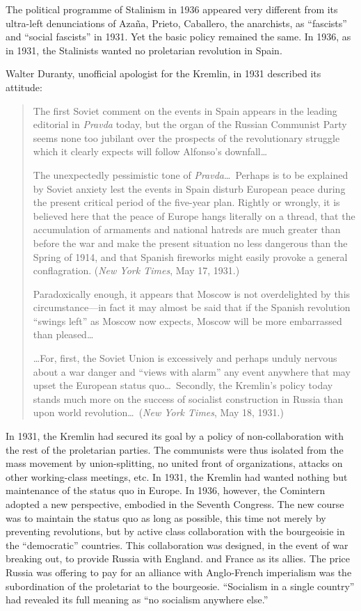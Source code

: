 The political programme of Stalinism in 1936 appeared very different from its ultra-left denunciations of Azaña, Prieto, Caballero, the anarchists, as ``fascists'' and ``social fascists'' in 1931. Yet the basic policy remained the same. In 1936, as in 1931, the Stalinists wanted no proletarian revolution in Spain.

Walter Duranty, unofficial apologist for the Kremlin, in 1931 described its attitude:

\begin{quotation}
  The first Soviet comment on the events in Spain appears in the leading editorial in \emph{Pravda} today, but the organ of the Russian Communist Party seems none too jubilant over the prospects of the revolutionary struggle which it clearly expects will follow Alfonso’s downfall\ldots
  
  The unexpectedly pessimistic tone of \emph{Pravda}\ldots\ Perhaps is to be explained by Soviet anxiety lest the events in Spain disturb European peace during the present critical period of the five-year plan. Rightly or wrongly, it is believed here that the peace of Europe hangs literally on a thread, that the accumulation of armaments and national hatreds are much greater than before the war and make the present situation no less dangerous than the Spring of 1914, and that Spanish fireworks might easily provoke a general conflagration. (\emph{New York Times}, May 17, 1931.)
  
  Paradoxically enough, it appears that Moscow is not overdelighted by this circumstance---in fact it may almost be said that if the Spanish revolution ``swings left'' as Moscow now expects, Moscow will be more embarrassed than pleased\ldots
  
  \ldots For, first, the Soviet Union is excessively and perhaps unduly nervous about a war danger and ``views with alarm'' any event anywhere that may upset the European status quo\ldots\ Secondly, the Kremlin’s policy today stands much more on the success of socialist construction in Russia than upon world revolution\ldots\ (\emph{New York Times}, May 18, 1931.)
\end{quotation}

In 1931, the Kremlin had secured its goal by a policy of non-col\-lab\-or\-ation with the rest of the proletarian parties. The communists were thus isolated from the mass movement by union-splitting, no united front of organizations, attacks on other working-class meetings, etc. In 1931, the Kremlin had wanted nothing but maintenance of the status quo in Europe. In 1936, however, the Comintern adopted a new perspective, embodied in the Seventh Congress. The new course was to maintain the status quo as long as possible, this time not merely by preventing revolutions, but by active class collaboration with the bourgeoisie in the ``democratic'' countries. This collaboration was designed, in the event of war breaking out, to provide Russia with England. and France as its allies. The price Russia was offering to pay for an alliance with Anglo-French imperialism was the subordination of the proletariat to the bourgeosie. ``Socialism in a single country'' had revealed its full meaning as ``no socialism anywhere else.''

